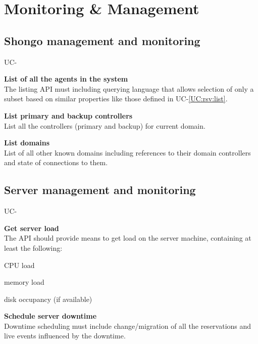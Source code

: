 \documentclass[a4paper]{report}
\makeatletter
\newcounter{UCcounter}
\newenvironment{UseCases}%
	{\begin{list}{UC-\arabic{UCcounter}}{\@nmbrlisttrue\def\@listctr{UCcounter}}}%
	{\end{list}}
\newcommand{\UClabel}[1]{\label{UC:#1}}
\newcommand{\UCref}[1]{UC-\ref{UC:#1}}
\newcommand{\UseCase}[2]{\item\UClabel{#2} \textbf{#1}\\}
\makeatother
\begin{document}
\section{Monitoring \& Management}

\subsection{Shongo management and monitoring}

\begin{UseCases}

\UseCase{List of all the agents in the system}{mgmt:shng:list-agents}

The listing API must including querying language that allows selection of only
a subset based on similar properties like those defined in \UCref{rsv:list}.

\UseCase{List primary and backup controllers}{mgmt:shng:list-controllers}

List all the controllers (primary and backup) for current domain.

\UseCase{List domains}{mgmt:shng:list-domains}

List of all other known domains including references to their domain
controllers and state of connections to them.

\end{UseCases}

\subsection{Server management and monitoring}

\begin{UseCases}

\UseCase{Get server load}{mgmt:srv:get-load}

The API should provide means to get load on the server machine, containing at
least the following:

\begin{compactitem}

\item CPU load

\item memory load

\item disk occupancy (if available)

\end{compactitem}


\UseCase{Schedule server downtime}{mgmt:srv:schedule-downtime}

Downtime scheduling must include change/migration of all the reservations and
live events influenced by the downtime.


\end{UseCases}
\end{document}
